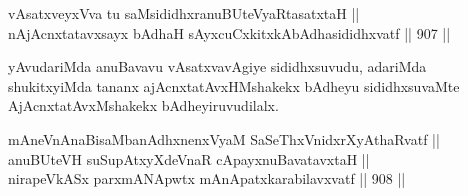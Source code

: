 
\begin{shl}
vAsatxveyxVva tu saMsididhxranuBUteVyaRtasatxtaH || \\
nAjAcnxtatavxsayx bAdhaH sAyxcuCxkitxkAbAdhasididhxvatf \hfill || 907 ||  
\end{shl}

\begin{artha}
yAvudariMda anuBavavu vAsatxvavAgiye sididhxsuvudu, adariMda shukitxyiMda tananx ajAcnxtatAvxHMshakekx bAdheyu sididhxsuvaMte AjAcnxtatAvxMshakekx bAdheyiruvudilalx.
\end{artha}

\begin{shl}
mAneVnAnaBisaMbanAdhxnenxVyaM SaSeThxVnidxrXyAthaRvatf || \\
anuBUteVH suSupAtxyXdeVnaR cApayxnuBavatavxtaH || \\
nirapeVkASx parxmANApwtx mAnApatxkarabilavxvatf \hfill || 908 ||  
\end{shl}

